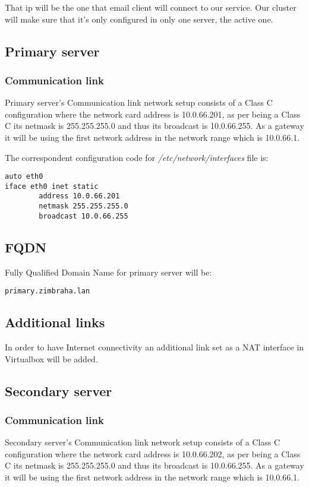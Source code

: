 That ip will be the one that email client will connect to our service. Our cluster will make sure that it's only configured in only one server, the active one.

\subsection {Primary server}

\subsubsection {Communication link}
Primary server's Communication link network setup consists of a Class C configuration where the network card address is 10.0.66.201, as per being a Class C its netmask is 255.255.255.0 and thus its broadcast is 10.0.66.255. As a gateway it will be using the first network address in the network range which is 10.0.66.1.


The correspondent configuration code for \textit{/etc/network/interfaces} file is:
\begin{verbatim}
auto eth0
iface eth0 inet static
        address 10.0.66.201
        netmask 255.255.255.0
        broadcast 10.0.66.255
\end{verbatim}
\subsection {FQDN}
Fully Qualified Domain Name for primary server will be:
\begin{verbatim}
primary.zimbraha.lan
\end{verbatim}
\subsection {Additional links}
In order to have Internet connectivity an additional link set as a NAT interface in Virtualbox will be added.

\subsection {Secondary server}

\subsubsection {Communication link}
Secondary server's Communication link network setup consists of a Class C configuration where the network card address is 10.0.66.202, as per being a Class C its netmask is 255.255.255.0 and thus its broadcast is 10.0.66.255. As a gateway it will be using the first network address in the network range which is 10.0.66.1.

